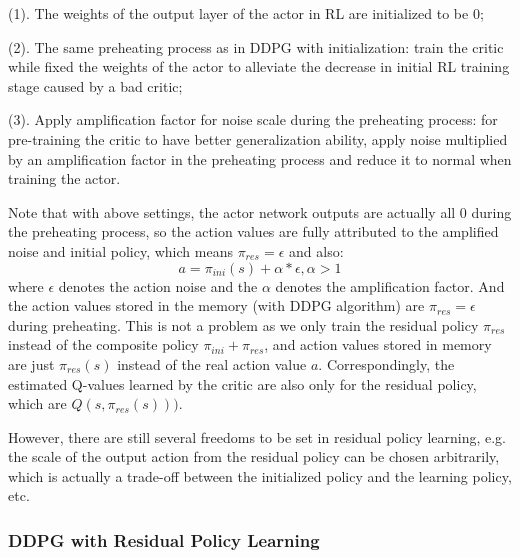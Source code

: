 \documentclass{article}
\begin{document}
(1). The weights of the output layer of the actor in RL are initialized to be 0;
 
(2). The same preheating process as in DDPG with initialization: train the critic while fixed the weights of the actor to alleviate the decrease in initial RL training stage caused by a bad critic;

(3). Apply amplification factor for noise scale during the preheating process: for pre-training the critic to have better generalization ability, apply noise multiplied by an amplification factor in the preheating process and reduce it to normal when training the actor.

Note that with above settings, the actor network outputs are actually all 0 during the preheating process, so the action values are fully attributed to the amplified noise and initial policy, which means $\pi_{res}=\epsilon$ and also:
\begin{equation}
a=\pi_{ini}(s)+\alpha * \epsilon, \alpha>1
\end{equation}
where $\epsilon$ denotes the action noise and the $\alpha$ denotes the amplification factor. And the action values stored in the memory (with DDPG algorithm) are $\pi_{res}=\epsilon$ during preheating. This is not a problem as we only train the residual policy $\pi_{res}$ instead of the composite policy $\pi_{ini}+\pi_{res}$, and action values stored in memory are just $\pi_{res}(s)$ instead of the real action value $a$. Correspondingly, the estimated Q-values learned by the critic are also only for the residual policy, which are $Q(s, \pi_{res}(s)))$.

However, there are still several freedoms to be set in residual policy learning, e.g. the scale of the output action from the residual policy can be chosen arbitrarily, which is actually a trade-off between the initialized policy and the learning policy, etc.

\subsubsection{DDPG with Residual Policy Learning}
\end{document}
